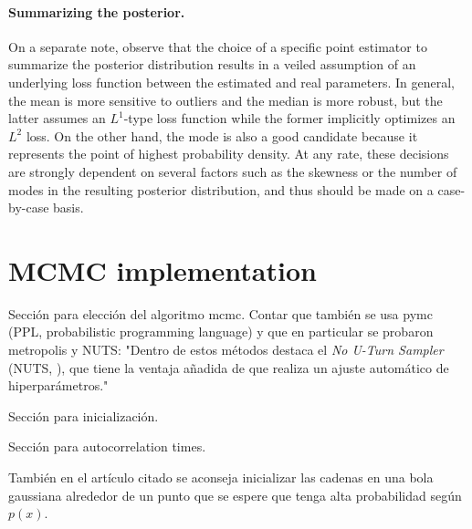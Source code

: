 \paragraph{Summarizing the posterior.} On a separate note, observe that the choice of a specific point estimator to summarize the posterior distribution results in a veiled assumption of an underlying loss function between the estimated and real parameters. In general, the mean is more sensitive to outliers and the median is more robust, but the latter assumes an \(L^1\)-type loss function while the former implicitly optimizes an \(L^2\) loss. On the other hand, the mode is also a good candidate because it represents the point of highest probability density. At any rate, these decisions are strongly dependent on several factors such as the skewness or the number of modes in the resulting posterior distribution, and thus should be made on a case-by-case basis. 

\section{MCMC implementation}

\begin{outcomment}
  Sección para elección del algoritmo mcmc. Contar que también se usa pymc (PPL, probabilistic programming language) y que en particular se probaron metropolis y NUTS: "Dentro de estos métodos destaca el \textit{No U-Turn Sampler} (NUTS, \citet{hoffman2014no}), que tiene la ventaja añadida de que realiza un ajuste automático de hiperparámetros."

\end{outcomment}

\begin{outcomment}
  Sección para inicialización.

  Sección para autocorrelation times.

  También en el artículo citado se aconseja inicializar las cadenas en una bola gaussiana alrededor de un punto que se espere que tenga alta probabilidad según \(p(x)\).
\end{outcomment}

